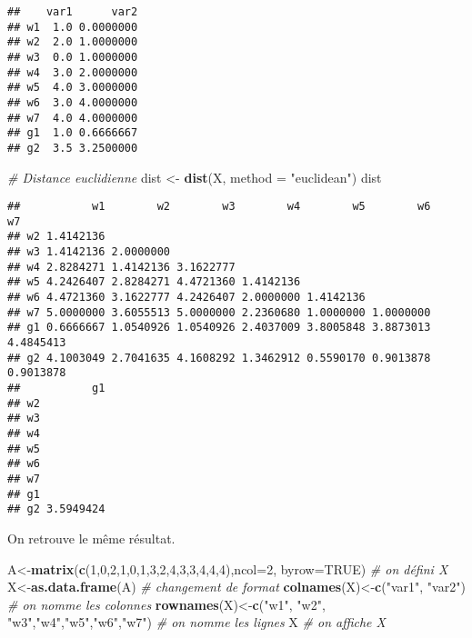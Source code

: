 \documentclass[
]{article}
\newenvironment{Shaded}{\begin{snugshade}}{\end{snugshade}}
\newcommand{\CommentTok}[1]{\textcolor[rgb]{0.56,0.35,0.01}{\textit{#1}}}
\newcommand{\DataTypeTok}[1]{\textcolor[rgb]{0.13,0.29,0.53}{#1}}
\newcommand{\DecValTok}[1]{\textcolor[rgb]{0.00,0.00,0.81}{#1}}
\newcommand{\KeywordTok}[1]{\textcolor[rgb]{0.13,0.29,0.53}{\textbf{#1}}}
\newcommand{\NormalTok}[1]{#1}
\newcommand{\OtherTok}[1]{\textcolor[rgb]{0.56,0.35,0.01}{#1}}
\newcommand{\StringTok}[1]{\textcolor[rgb]{0.31,0.60,0.02}{#1}}
\begin{document}
\begin{verbatim}
##    var1      var2
## w1  1.0 0.0000000
## w2  2.0 1.0000000
## w3  0.0 1.0000000
## w4  3.0 2.0000000
## w5  4.0 3.0000000
## w6  3.0 4.0000000
## w7  4.0 4.0000000
## g1  1.0 0.6666667
## g2  3.5 3.2500000
\end{verbatim}

\begin{Shaded}
\begin{Highlighting}[]
\CommentTok{# Distance euclidienne}
\NormalTok{dist <-}\StringTok{ }\KeywordTok{dist}\NormalTok{(X, }\DataTypeTok{method =} \StringTok{"euclidean"}\NormalTok{)}
\NormalTok{dist}
\end{Highlighting}
\end{Shaded}

\begin{verbatim}
##           w1        w2        w3        w4        w5        w6        w7
## w2 1.4142136                                                            
## w3 1.4142136 2.0000000                                                  
## w4 2.8284271 1.4142136 3.1622777                                        
## w5 4.2426407 2.8284271 4.4721360 1.4142136                              
## w6 4.4721360 3.1622777 4.2426407 2.0000000 1.4142136                    
## w7 5.0000000 3.6055513 5.0000000 2.2360680 1.0000000 1.0000000          
## g1 0.6666667 1.0540926 1.0540926 2.4037009 3.8005848 3.8873013 4.4845413
## g2 4.1003049 2.7041635 4.1608292 1.3462912 0.5590170 0.9013878 0.9013878
##           g1
## w2          
## w3          
## w4          
## w5          
## w6          
## w7          
## g1          
## g2 3.5949424
\end{verbatim}

On retrouve le même résultat.

\begin{Shaded}
\begin{Highlighting}[]
\NormalTok{A<-}\KeywordTok{matrix}\NormalTok{(}\KeywordTok{c}\NormalTok{(}\DecValTok{1}\NormalTok{,}\DecValTok{0}\NormalTok{,}\DecValTok{2}\NormalTok{,}\DecValTok{1}\NormalTok{,}\DecValTok{0}\NormalTok{,}\DecValTok{1}\NormalTok{,}\DecValTok{3}\NormalTok{,}\DecValTok{2}\NormalTok{,}\DecValTok{4}\NormalTok{,}\DecValTok{3}\NormalTok{,}\DecValTok{3}\NormalTok{,}\DecValTok{4}\NormalTok{,}\DecValTok{4}\NormalTok{,}\DecValTok{4}\NormalTok{),}\DataTypeTok{ncol=}\DecValTok{2}\NormalTok{, }\DataTypeTok{byrow=}\OtherTok{TRUE}\NormalTok{) }\CommentTok{# on défini X}
\NormalTok{X<-}\KeywordTok{as.data.frame}\NormalTok{(A) }\CommentTok{# changement de format}
\KeywordTok{colnames}\NormalTok{(X)<-}\KeywordTok{c}\NormalTok{(}\StringTok{"var1"}\NormalTok{, }\StringTok{"var2"}\NormalTok{) }\CommentTok{# on nomme les colonnes}
\KeywordTok{rownames}\NormalTok{(X)<-}\KeywordTok{c}\NormalTok{(}\StringTok{"w1"}\NormalTok{, }\StringTok{"w2"}\NormalTok{, }\StringTok{"w3"}\NormalTok{,}\StringTok{"w4"}\NormalTok{,}\StringTok{"w5"}\NormalTok{,}\StringTok{"w6"}\NormalTok{,}\StringTok{"w7"}\NormalTok{) }\CommentTok{# on nomme les lignes}
\NormalTok{X }\CommentTok{# on affiche X}
\end{Highlighting}
\end{Shaded}
\end{document}
